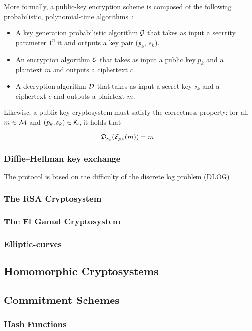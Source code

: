 More formally, a public-key encryption scheme is composed of the following probabilistic, polynomial-time algorithms~\cite{Katz:2014:IMC:2700550, kiagias:crypto}:

\begin{itemize}
  \item A key generation probabilistic algorithm $\mathcal{G}$ that takes as input a security parameter $1^{n}$ it and outputs a key pair ($p_k$, $s_k$).
  \item An encryption algorithm $\mathcal{E}$ that takes as input a public key $p_k$ and a plaintext $m$ and outputs a ciphertext $c$.
  \item A decryption algorithm $\mathcal{D}$ that takes as input a secret key $s_k$ and a ciphertext $c$ and outputs a plaintext $m$.
\end{itemize}

Likewise, a public-key cryptosystem must satisfy the correctness property: for all $m \in \mathcal{M}$ and $(p_k, s_k) \in \mathcal{K}$, it holds that

\begin{equation*}
  \mathcal{D}_{s_k}(\mathcal{E}_{p_k}(m)) = m
\end{equation*}

\subsubsection{Diffie–Hellman key exchange}
\label{preliminaries:crypto_block:pub:dh}

The protocol is based on the difficulty of the discrete log problem (DLOG)

\subsubsection{The RSA Cryptosystem}
\label{preliminaries:crypto_block:pub:rsa}



\subsubsection{The El Gamal Cryptosystem}
\label{preliminaries:crypto_block:pub:el_gamal}

\subsubsection{Elliptic-curves}
\label{preliminaries:crypto_block:pub:el_curves}

\subsection{Homomorphic Cryptosystems}
\label{preliminaries:crypto_block:homo}

\subsection{Commitment Schemes}
\label{preliminaries:crypto_block:comm}

\subsubsection{Hash Functions}
\label{preliminaries:crypto_block:pub:comm:hash}
